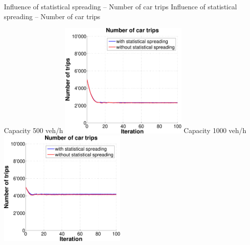 \createfigure%
{Influence of statistical spreading -- Number of car trips}%
{Influence of statistical spreading -- Number of car trips}%
{\label{fig:statisticalSpreadingNumCarTrips}}%
{%
  \createsubfigure%
  {Capacity 500 veh/h}%
  {\includegraphics[width=0.47\textwidth, angle=0, trim=0mm 0mm 0mm 9mm, clip=true]{extending/figures/MultiModalSimulation/simulations/num_car_trips_no_scatter_500}}%
  {\label{}}%
  {\hspace{3mm}}%
  \createsubfigure%
  {Capacity 1000 veh/h}%
  {\includegraphics[width=0.47\textwidth, angle=0, trim=0mm 0mm 0mm 9mm, clip=true]{extending/figures/MultiModalSimulation/simulations/num_car_trips_no_scatter_1000}}%
  {\label{}}%
  {\vspace{7.5mm}}%

}
